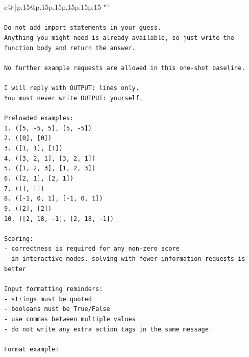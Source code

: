 \documentclass{article}
\begin{document}
{\begin{supertabular}{c@{$\;$}|p{.15\linewidth}@{}p{.15\linewidth}p{.15\linewidth}p{.15\linewidth}p{.15\linewidth}p{.15\linewidth}}
{{{\texttt{```} \\
\\ 
\texttt{Do not add import statements in your guess.} \\
\texttt{Anything you might need is already available, so just write the function body and return the answer.} \\
\\ 
\texttt{No further example requests are allowed in this one{-}shot baseline.} \\
\\ 
\texttt{I will reply with OUTPUT: lines only.} \\
\texttt{You must never write OUTPUT: yourself.} \\
\\ 
\texttt{Preloaded examples:} \\
\texttt{1. ({[}5, {-}5, 5{]}, {[}5, {-}5{]})} \\
\texttt{2. ({[}0{]}, {[}0{]})} \\
\texttt{3. ({[}1, 1{]}, {[}1{]})} \\
\texttt{4. ({[}3, 2, 1{]}, {[}3, 2, 1{]})} \\
\texttt{5. ({[}1, 2, 3{]}, {[}1, 2, 3{]})} \\
\texttt{6. ({[}2, 1{]}, {[}2, 1{]})} \\
\texttt{7. ({[}{]}, {[}{]})} \\
\texttt{8. ({[}{-}1, 0, 1{]}, {[}{-}1, 0, 1{]})} \\
\texttt{9. ({[}2{]}, {[}2{]})} \\
\texttt{10. ({[}2, 18, {-}1{]}, {[}2, 18, {-}1{]})} \\
\\ 
\texttt{Scoring:} \\
\texttt{{-} correctness is required for any non{-}zero score} \\
\texttt{{-} in interactive modes, solving with fewer information requests is better} \\
\\ 
\texttt{Input formatting reminders:} \\
\texttt{{-} strings must be quoted} \\
\texttt{{-} booleans must be True/False} \\
\texttt{{-} use commas between multiple values} \\
\texttt{{-} do not write any extra action tags in the same message} \\
\\ 
\texttt{Format example:} \\
}}}
\end{supertabular}}
\end{document}
